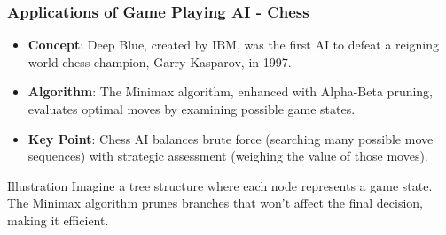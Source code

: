 \documentclass[aspectratio=169]{beamer}
\begin{document}
\begin{frame}[fragile]
    \frametitle{Applications of Game Playing AI - Chess}
    \begin{itemize}
        \item \textbf{Concept}: Deep Blue, created by IBM, was the first AI to defeat a reigning world chess champion, Garry Kasparov, in 1997.
        \item \textbf{Algorithm}: The Minimax algorithm, enhanced with Alpha-Beta pruning, evaluates optimal moves by examining possible game states.
        \item \textbf{Key Point}: Chess AI balances brute force (searching many possible move sequences) with strategic assessment (weighing the value of those moves).
    \end{itemize}
    \begin{block}{Illustration}
        Imagine a tree structure where each node represents a game state. The Minimax algorithm prunes branches that won’t affect the final decision, making it efficient.
    \end{block}
\end{frame}
\end{document}
